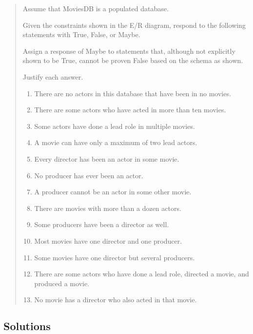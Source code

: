 \begin{quote}
  Assume that MoviesDB is a populated database.

	Given the constraints shown in the E/R diagram,
	respond to the following statements with True, False, or Maybe.

	Assign a response of Maybe to statements that, although not explicitly
  shown to be True, cannot be proven False based on the schema as shown.

  Justify each answer.

  \begin{enumerate}
    \item
      There are no actors in this database that have been in no movies.
    \item
      There are some actors who have acted in more than ten movies.
    \item
      Some actors have done a lead role in multiple movies.
    \item
      A movie can have only a maximum of two lead actors.
    \item
      Every director has been an actor in some movie.
    \item
      No producer has ever been an actor.
    \item
      A producer cannot be an actor in some other movie.
    \item
      There are movies with more than a dozen actors.
    \item
      Some producers have been a director as well.
    \item
      Most movies have one director and one producer.
    \item
      Some movies have one director but several producers.
    \item
      There are some actors who have done a lead role, directed a movie,
      and produced a movie.
    \item
      No movie has a director who also acted in that movie.
  \end{enumerate}
\end{quote}


\subsection{Solutions}

